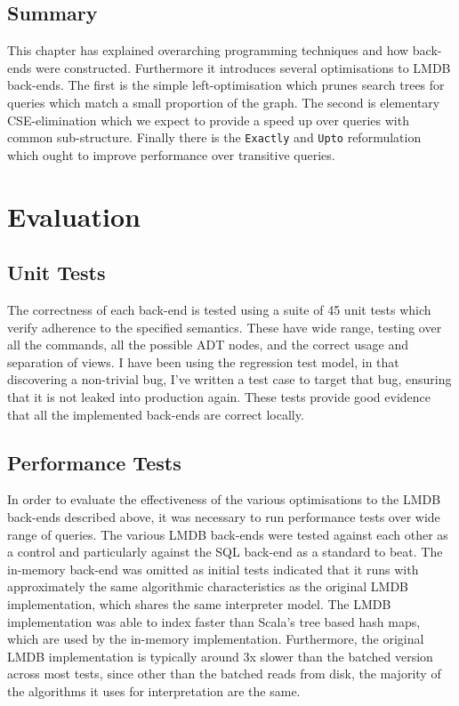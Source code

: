 \documentclass[12pt,a4paper,twoside,openright]{report}
\newcommand\codeName[1]{\texttt{#1}}
\begin{document}
\section{Summary}
This chapter has explained overarching programming techniques and how back-ends were constructed. Furthermore it introduces several optimisations to LMDB back-ends. The first is the simple left-optimisation which prunes search trees for queries which match a small proportion of the graph. The second is elementary CSE-elimination which we expect to provide a speed up over queries with common sub-structure. Finally there is the \codeName{Exactly} and \codeName{Upto} reformulation which ought to improve performance over transitive queries.

\chapter{Evaluation}
\section{Unit Tests}
The correctness of each back-end is tested using a suite of 45 unit tests which verify adherence to the specified semantics. These have  wide range, testing over all the commands, all the possible ADT nodes, and the correct usage and separation of views. I have been using the regression test model, in that discovering a non-trivial bug, I've written a test case to target that bug, ensuring that it is not leaked into production again. These tests provide good evidence that all the implemented back-ends are correct locally.
\section{Performance Tests}
	In order to evaluate the effectiveness of the various optimisations to the LMDB back-ends described above, it was necessary to run performance tests over wide range of queries. The various LMDB back-ends were tested against each other as a control and particularly against the SQL back-end as a standard to beat. The in-memory back-end was omitted as initial tests indicated that it runs with approximately the same algorithmic characteristics as the original LMDB implementation, which shares the same interpreter model. The LMDB implementation was able to index faster than Scala's tree based hash maps, which are used by the in-memory implementation. Furthermore, the original LMDB implementation is typically around 3x slower than the batched version across most tests, since other than the batched reads from disk, the majority of the algorithms it uses for interpretation are the same.
\end{document}
